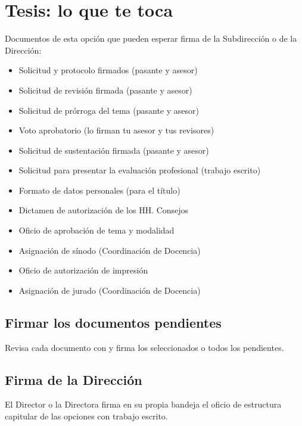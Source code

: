 \section{Tesis: lo que te toca}
Documentos de esta opción que pueden esperar firma de la Subdirección o de la Dirección:
\begin{itemize}
  \item Solicitud y protocolo firmados (pasante y asesor)
  \item Solicitud de revisión firmada (pasante y asesor)
  \item Solicitud de prórroga del tema (pasante y asesor)
  \item Voto aprobatorio (lo firman tu asesor y tus revisores)
  \item Solicitud de sustentación firmada (pasante y asesor)
  \item Solicitud para presentar la evaluación profesional (trabajo escrito)
  \item Formato de datos personales (para el título)
  \item Dictamen de autorización de los HH. Consejos
  \item Oficio de aprobación de tema y modalidad
  \item Asignación de sínodo (Coordinación de Docencia)
  \item Oficio de autorización de impresión
  \item Asignación de jurado (Coordinación de Docencia)
\end{itemize}
\subsection{Firmar los documentos pendientes}
Revisa cada documento con  y firma los seleccionados o todos los pendientes.
\subsection{Firma de la Dirección}
El Director o la Directora firma en su propia bandeja el oficio de estructura capitular de las opciones con trabajo escrito.
